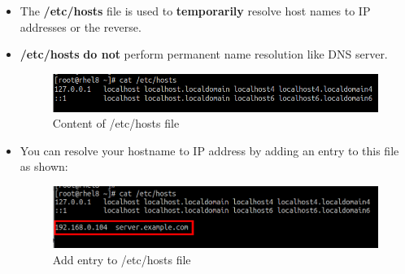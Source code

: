 \setlength{\columnsep}{3pt}
\begin{flushleft}
\bigskip

\begin{itemize}
	\item The \textbf{/etc/hosts} file is used to \textbf{temporarily} resolve host names to IP addresses or the reverse. 
	\item \textbf{/etc/hosts} \textbf{do not} perform permanent name resolution like DNS server.
	\begin{figure}[h!]
		\centering
		\includegraphics[scale=.45]{content/chapter14/images/hosts.png}
		\caption{Content of /etc/hosts file}
		\label{fig:hosts}
	\end{figure}		

	\item You can resolve your hostname to IP address by adding an entry to this file as shown:
	\begin{figure}[h!]
		\centering
		\includegraphics[scale=.35]{content/chapter14/images/hosts3.png}
		\caption{Add entry to /etc/hosts file}
		\label{fig:hosts3}
	\end{figure}		
	

\end{itemize}
\end{flushleft}
